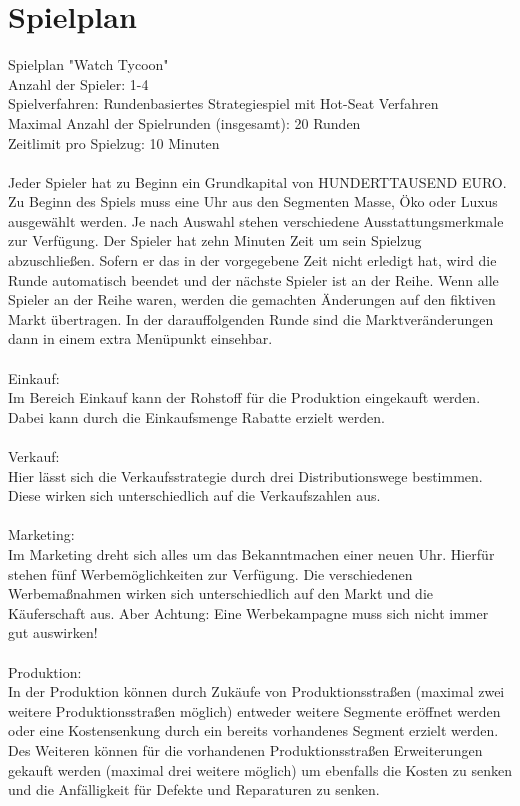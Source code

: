\clearpage
\chapter{Spielplan}
Spielplan "Watch Tycoon" \\
Anzahl der Spieler: 1-4 \\
Spielverfahren: Rundenbasiertes Strategiespiel mit Hot-Seat Verfahren \\
Maximal Anzahl der Spielrunden (insgesamt): 20 Runden \\
Zeitlimit pro Spielzug: 10 Minuten \\
\\
Jeder Spieler hat zu Beginn ein Grundkapital von HUNDERTTAUSEND EURO. Zu Beginn des Spiels muss eine Uhr aus den Segmenten Masse, Öko oder Luxus ausgewählt werden. Je nach Auswahl stehen verschiedene Ausstattungsmerkmale zur Verfügung. Der Spieler hat zehn Minuten Zeit um sein Spielzug abzuschließen. Sofern er das in der vorgegebene Zeit nicht erledigt hat, wird die Runde automatisch beendet und der nächste Spieler ist an der Reihe. Wenn alle Spieler an der Reihe waren, werden die gemachten Änderungen auf den fiktiven Markt übertragen. In der darauffolgenden Runde sind die Marktveränderungen dann in einem extra Menüpunkt einsehbar. \\ 
\\
Einkauf:\\
Im Bereich Einkauf kann der Rohstoff für die Produktion eingekauft werden. Dabei kann durch die Einkaufsmenge Rabatte erzielt werden. \\
\\
Verkauf: \\
Hier lässt sich die Verkaufsstrategie durch drei Distributionswege bestimmen. Diese wirken sich unterschiedlich auf die Verkaufszahlen aus.\\
\\
Marketing:\\
Im Marketing dreht sich alles um das Bekanntmachen einer neuen Uhr. Hierfür stehen fünf Werbemöglichkeiten zur Verfügung. Die verschiedenen Werbemaßnahmen wirken sich unterschiedlich auf den Markt und die Käuferschaft aus. Aber Achtung: Eine Werbekampagne muss sich nicht immer gut auswirken!\\ 
\\
Produktion: \\
In der Produktion können durch Zukäufe von Produktionsstraßen (maximal zwei weitere Produktionsstraßen möglich) entweder weitere Segmente eröffnet werden oder eine Kostensenkung durch ein bereits vorhandenes Segment erzielt werden. Des Weiteren können für die vorhandenen Produktionsstraßen Erweiterungen gekauft werden (maximal drei weitere möglich) um ebenfalls die Kosten zu senken und die Anfälligkeit für Defekte und Reparaturen zu senken. \\ 
